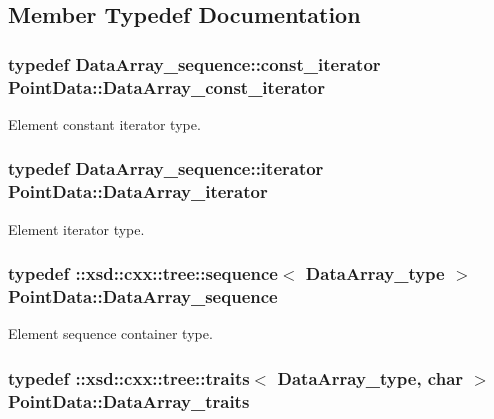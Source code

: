 \subsection{Member Typedef Documentation}
\hypertarget{classPointData_a6bd3313479b6a109e24bc9e7b306831b}{
\subsubsection[{Data\+Array\+\_\+const\+\_\+iterator}]{\setlength{\rightskip}{0pt plus 5cm}typedef Data\+Array\+\_\+sequence\+::const\+\_\+iterator {\bf Point\+Data\+::\+Data\+Array\+\_\+const\+\_\+iterator}}}\label{classPointData_a6bd3313479b6a109e24bc9e7b306831b}


Element constant iterator type. 

\hypertarget{classPointData_afb66f793f2a65ca38e3cd8fa21eef701}{
\subsubsection[{Data\+Array\+\_\+iterator}]{\setlength{\rightskip}{0pt plus 5cm}typedef Data\+Array\+\_\+sequence\+::iterator {\bf Point\+Data\+::\+Data\+Array\+\_\+iterator}}}\label{classPointData_afb66f793f2a65ca38e3cd8fa21eef701}


Element iterator type. 

\hypertarget{classPointData_acd882fa412789571fcaa2599ad2b2c71}{
\subsubsection[{Data\+Array\+\_\+sequence}]{\setlength{\rightskip}{0pt plus 5cm}typedef \+::xsd\+::cxx\+::tree\+::sequence$<$ {\bf Data\+Array\+\_\+type} $>$ {\bf Point\+Data\+::\+Data\+Array\+\_\+sequence}}}\label{classPointData_acd882fa412789571fcaa2599ad2b2c71}


Element sequence container type. 

\hypertarget{classPointData_ae9066a14984b6f7aa938ba2d58244055}{
\subsubsection[{Data\+Array\+\_\+traits}]{\setlength{\rightskip}{0pt plus 5cm}typedef \+::xsd\+::cxx\+::tree\+::traits$<$ {\bf Data\+Array\+\_\+type}, char $>$ {\bf Point\+Data\+::\+Data\+Array\+\_\+traits}}}\label{classPointData_ae9066a14984b6f7aa938ba2d58244055}


